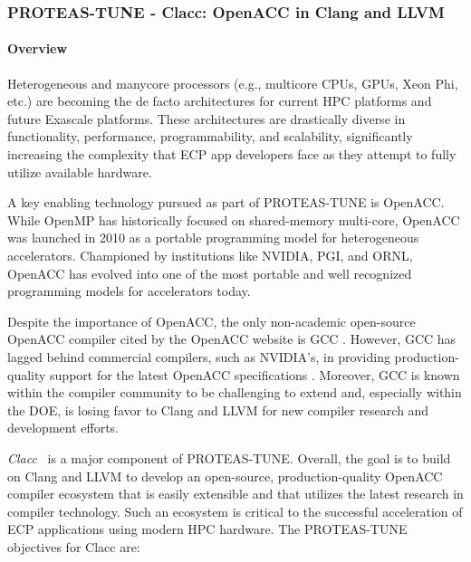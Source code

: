 \subsubsection{ PROTEAS-TUNE - Clacc: OpenACC in Clang and LLVM}\label{s:clacc}


\paragraph{Overview}

Heterogeneous and manycore processors (e.g., multicore CPUs, GPUs,
Xeon Phi, etc.) are becoming the de facto architectures for current
HPC platforms and future Exascale platforms.  These architectures are
drastically diverse in functionality, performance, programmability,
and scalability, significantly increasing the complexity that ECP app
developers face as they attempt to fully utilize available hardware.

A key enabling technology pursued as part of PROTEAS-TUNE is OpenACC.
While OpenMP has historically focused on shared-memory multi-core,
OpenACC was launched in 2010 as a portable programming model for
heterogeneous accelerators.  Championed by institutions like NVIDIA,
PGI, and ORNL, OpenACC has evolved into one of the most portable and
well recognized programming models for accelerators today.

Despite the importance of OpenACC, the only non-academic open-source
OpenACC compiler cited by the OpenACC website is
GCC \cite{openaccOrgTools}.  However, GCC has lagged behind commercial
compilers, such as NVIDIA's, in providing production-quality support
for the latest OpenACC specifications
\cite{openACCValidationSuite}.  Moreover, GCC is known within the compiler
community to be challenging to extend and, especially within the DOE,
is losing favor to Clang and LLVM for new compiler research and
development efforts.

\textit{Clacc}~\cite{clacc:2018:denny} is a major component of
PROTEAS-TUNE.  Overall, the goal is to build on Clang and LLVM to
develop an open-source, production-quality OpenACC compiler ecosystem
that is easily extensible and that utilizes the latest research in
compiler technology.  Such an ecosystem is critical to the successful
acceleration of ECP applications using modern HPC hardware.  The
PROTEAS-TUNE objectives for Clacc are:

